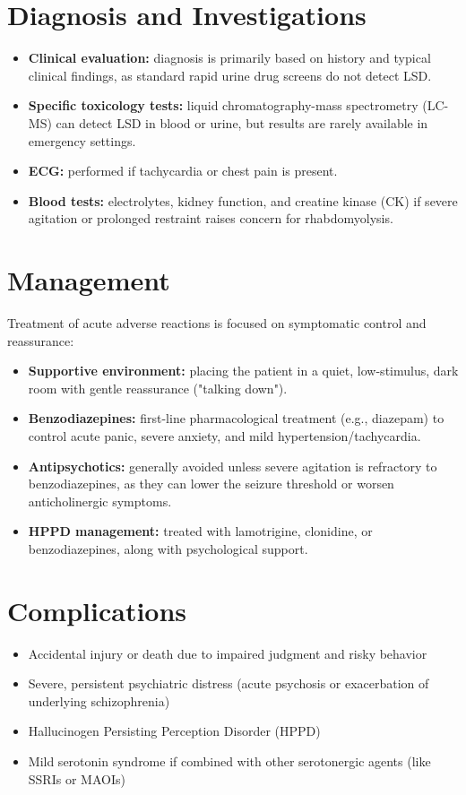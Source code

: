 \section*{Diagnosis and Investigations}
\begin{itemize}
    \item \textbf{Clinical evaluation:} diagnosis is primarily based on history and typical clinical findings, as standard rapid urine drug screens do not detect LSD.
    \item \textbf{Specific toxicology tests:} liquid chromatography-mass spectrometry (LC-MS) can detect LSD in blood or urine, but results are rarely available in emergency settings.
    \item \textbf{ECG:} performed if tachycardia or chest pain is present.
    \item \textbf{Blood tests:} electrolytes, kidney function, and creatine kinase (CK) if severe agitation or prolonged restraint raises concern for rhabdomyolysis.
\end{itemize}

\section*{Management}
Treatment of acute adverse reactions is focused on symptomatic control and reassurance:

\begin{itemize}
    \item \textbf{Supportive environment:} placing the patient in a quiet, low-stimulus, dark room with gentle reassurance ("talking down").
    \item \textbf{Benzodiazepines:} first-line pharmacological treatment (e.g., diazepam) to control acute panic, severe anxiety, and mild hypertension/tachycardia.
    \item \textbf{Antipsychotics:} generally avoided unless severe agitation is refractory to benzodiazepines, as they can lower the seizure threshold or worsen anticholinergic symptoms.
    \item \textbf{HPPD management:} treated with lamotrigine, clonidine, or benzodiazepines, along with psychological support.
\end{itemize}

\section*{Complications}
\begin{itemize}
    \item Accidental injury or death due to impaired judgment and risky behavior
    \item Severe, persistent psychiatric distress (acute psychosis or exacerbation of underlying schizophrenia)
    \item Hallucinogen Persisting Perception Disorder (HPPD)
    \item Mild serotonin syndrome if combined with other serotonergic agents (like SSRIs or MAOIs)
\end{itemize}

